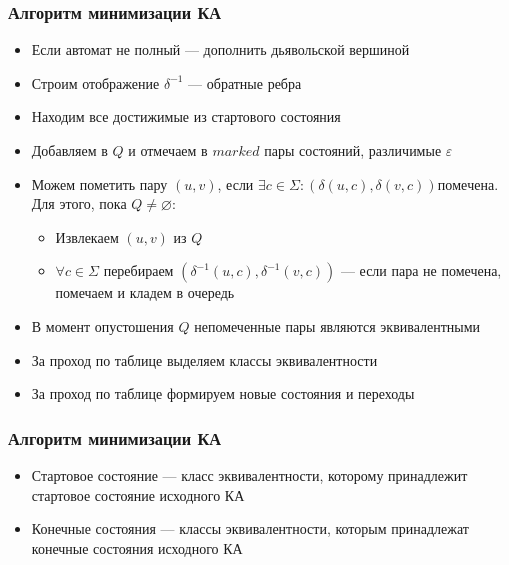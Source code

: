 \documentclass{beamer}
\begin{document}
\begin{frame}[fragile]
  \transwipe[direction=90]
  \frametitle{Алгоритм минимизации КА}
    \begin{itemize}
      \item Если автомат не полный --- дополнить дьявольской вершиной
      \item Строим отображение $\delta^{-1}$ --- обратные ребра
      \item Находим все достижимые из стартового состояния
      \item Добавляем в $Q$ и отмечаем в $marked$ пары состояний, различимые $\varepsilon$
      \item Можем пометить пару $(u, v)$, если $\exists c \in \Sigma :  (\delta(u, c), \delta(v, c)) помечена$. Для этого, пока $Q \neq \varnothing$:
      \begin{itemize}
        \item Извлекаем $(u, v)$ из $Q$
        \item $\forall c \in \Sigma$ перебираем $(\delta^{-1}(u, c), \delta^{-1}(v, c))$ --- если пара не помечена, помечаем и кладем в очередь
      \end{itemize}
      \item В момент опустошения $Q$ непомеченные пары являются эквивалентными
      \item За проход по таблице выделяем классы эквивалентности
      \item За проход по таблице формируем новые состояния и переходы
    \end{itemize}

\end{frame}

\begin{frame}[fragile]
  \transwipe[direction=90]
  \frametitle{Алгоритм минимизации КА}
    \begin{itemize}
      \item Стартовое состояние --- класс эквивалентности, которому принадлежит стартовое состояние исходного КА
      \item Конечные состояния --- классы эквивалентности, которым принадлежат конечные состояния исходного КА
    \end{itemize}

\end{frame}
\end{document}
